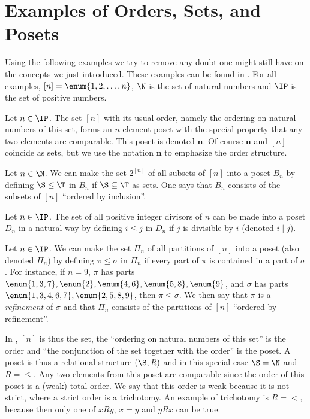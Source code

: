 \section{Examples of Orders, Sets, and Posets}

Using the following examples we try to remove any doubt one might still have on
the concepts we just introduced. These examples can be found in
\citet*{Stanley:2011:ECV:2124415}. For all examples, $[n] = \enum{1, 2,
\ldots, n}$, $\N$ is the set of natural numbers and $\IP$ is the set of
positive numbers.
\begin{example}
\label{ex:poset:def}

\item\label{ex:poset:def:a} Let $n \in \IP$. The set $[n]$ with its usual order,
namely the ordering on natural numbers of this set, forms an $n$-element poset
with the special property that any two elements are comparable. This poset is
denoted $\bm{n}$. Of course $\bm{n}$ and $[n]$ coincide as sets, but we use the
notation $\bm{n}$ to emphasize the order structure.

\item\label{ex:poset:def:b} Let $n \in \N$. We can make the set $2^{[n]}$ of
all subsets of $[n]$ into a poset $B_n$ by defining $\S \leq \T$ in $B_n$ if $\S
\subseteq \T$ as sets. One says that $B_n$ consists of the subsets of $[n]$
``ordered by inclusion''.

\item\label{ex:poset:def:c}  Let $n \in \IP$. The set of all positive integer
divisors of $n$ can be made into a poset $D_n$ in a natural way by defining $i
\leq j$ in $D_n$ if $j$ is divisible by $i$ (denoted $i \mid j$).

\item\label{ex:poset:def:d}  Let $n \in \IP$. We can make the set $\Pi_n$ of all
partitions of $[n]$ into a poset (also denoted $\Pi_n$) by defining $\pi \leq
\sigma$ in $\Pi_n$ if every part of $\pi$ is contained in a part of $\sigma$.
For instance, if $n = 9$, $\pi$ has parts $\enum{1,3,7}, \enum{2}, \enum{4,6},
\enum{5,8}, \enum{9}$, and
$\sigma$ has parts $\enum{1,3,4,6,7}, \enum{2,5,8,9}$, then $\pi \leq \sigma$. We then say that
$\pi$ is a \emph{refinement} of $\sigma$ and that $\Pi_n$ consists of the
partitions of $[n]$ ``ordered by refinement''.
\end{example}

In , $[n]$ is thus the set, the ``ordering on natural
numbers of this set'' is the order and ``the conjunction of the set together
with the order'' is the poset. A poset is thus a relational structure $(\S, R)$
and in this special case $\S = \N$ and $R = \le$. Any two elements from this
poset are comparable since the order of this poset is a (weak) total order. We
say that this order is weak because it is not strict, where a strict order is a
trichotomy. An example of trichotomy is $R = <$, because then only
one of $x R y$, $x = y$ and $y R x$ can be true.

